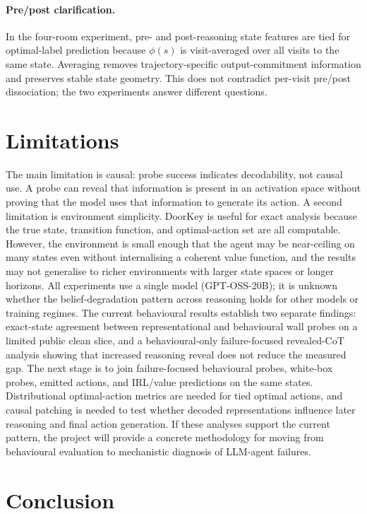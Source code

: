 \documentclass[final]{sparreport}
\begin{document}
\paragraph{Pre/post clarification.} In the four-room experiment, pre- and post-reasoning state features are tied for optimal-label prediction because $\phi(s)$ is visit-averaged over all visits to the same state. Averaging removes trajectory-specific output-commitment information and preserves stable state geometry. This does not contradict per-visit pre/post dissociation; the two experiments answer different questions.


\section{Limitations}

The main limitation is causal: probe success indicates decodability, not causal use.
A probe can reveal that information is present in an activation space without proving
that the model uses that information to generate its action. 
A second limitation is environment simplicity. DoorKey is useful for exact analysis
because the true state, transition function, and optimal-action set are all computable.
However, the environment is small enough that the agent may be near-ceiling on many
states even without internalising a coherent value function, and the results may not
generalise to richer environments with larger state spaces or longer horizons.
All experiments use a single model (GPT-OSS-20B); it is unknown whether the
belief-degradation pattern across reasoning holds for other models or training regimes.
The current behavioural results establish two separate findings: exact-state agreement between representational and behavioural wall probes on a limited public clean slice, and a behavioural-only failure-focused revealed-CoT analysis showing that increased reasoning reveal does not reduce the measured gap. The next stage is to join failure-focused behavioural probes, white-box probes, emitted actions, and IRL/value predictions on the same states. Distributional optimal-action metrics are needed for tied optimal actions, and causal patching is needed to test whether decoded representations influence later reasoning and final action generation. If these analyses support the current pattern, the project will provide a concrete methodology for moving from behavioural evaluation to mechanistic diagnosis of LLM-agent failures.

\section{Conclusion}
\end{document}
